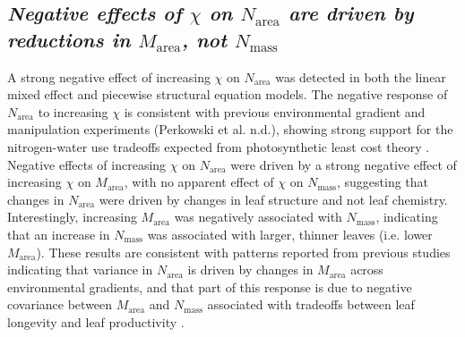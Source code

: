 \subsection{\textit{Negative effects of $\chi$ on $N_\mathrm{area}$ are driven by reductions in $M_\mathrm{area}$, not $N_\mathrm{mass}$}}
A strong negative effect of increasing $\chi$ on $N_\mathrm{area}$ was detected in both the linear mixed effect and piecewise structural equation models. The negative response of $N_\mathrm{area}$ to increasing $\chi$ is consistent with previous environmental gradient  and manipulation experiments (Perkowski et al. n.d.), showing strong support for the nitrogen-water use tradeoffs expected from photosynthetic least cost theory . Negative effects of increasing $\chi$ on $N_\mathrm{area}$ were driven by a strong negative effect of increasing $\chi$ on $M_\mathrm{area}$, with no apparent effect of $\chi$ on $N_\mathrm{mass}$, suggesting that changes in $N_\mathrm{area}$ were driven by changes in leaf structure and not leaf chemistry. Interestingly, increasing $M_\mathrm{area}$ was negatively associated with $N_\mathrm{mass}$, indicating that an increase in $N_\mathrm{mass}$ was associated with larger, thinner leaves (i.e. lower $M_\mathrm{area}$). These results are consistent with patterns reported from previous studies indicating that variance in $N_\mathrm{area}$ is driven by changes in $M_\mathrm{area}$ across environmental gradients, and that part of this response is due to negative covariance between $M_\mathrm{area}$ and $N_\mathrm{mass}$ associated with tradeoffs between leaf longevity and leaf productivity .

